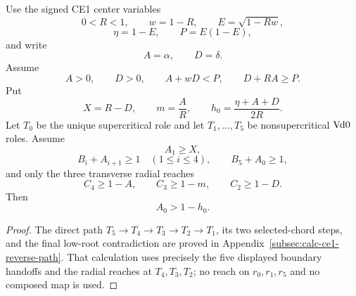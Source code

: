 \begin{proposition}
\label{prop:new-ce1-direct-certificate}
Use the signed CE1 center variables
\[
0<R<1,
\qquad w=1-R,
\qquad E=\sqrt{1-Rw},
\]
\[
\eta=1-E,
\qquad P=E(1-E),
\]
and write
\[
 A=\alpha,
 \qquad D=\delta.
\]
Assume
\[
 A>0,
 \qquad D>0,
 \qquad A+wD<P,
 \qquad D+RA\ge P.
 \tag{6.12}
\]
Put
\[
 X=R-D,
 \qquad m=\frac AR,
 \qquad h_0=\frac{\eta+A+D}{2R}.
 \tag{6.13}
\]
Let $T_0$ be the unique supercritical role and let
$T_1,\ldots,T_5$ be nonsupercritical $\mathrm{Vd0}$ roles.  Assume
\[
 A_1\ge X,
\]
\[
 B_i+A_{i+1}\ge1\quad(1\le i\le4),
 \qquad B_5+A_0\ge1,
\]
and only the three transverse radial reaches
\[
 C_4\ge1-A,\qquad C_3\ge1-m,\qquad C_2\ge1-D.
 \tag{6.14}
\]
Then
\[
 \boxed{A_0>1-h_0.}
 \tag{6.15}
\]
\end{proposition}

\begin{proof}
The direct path $T_5\to T_4\to T_3\to T_2\to T_1$, its two selected-chord
steps, and the final low-root contradiction are proved in
Appendix~\ref{subsec:calc-ce1-reverse-path}.  That calculation uses precisely
the five displayed boundary handoffs and the radial reaches at
$T_4,T_3,T_2$; no reach on $r_0,r_1,r_5$ and no composed map is used.
\end{proof}
